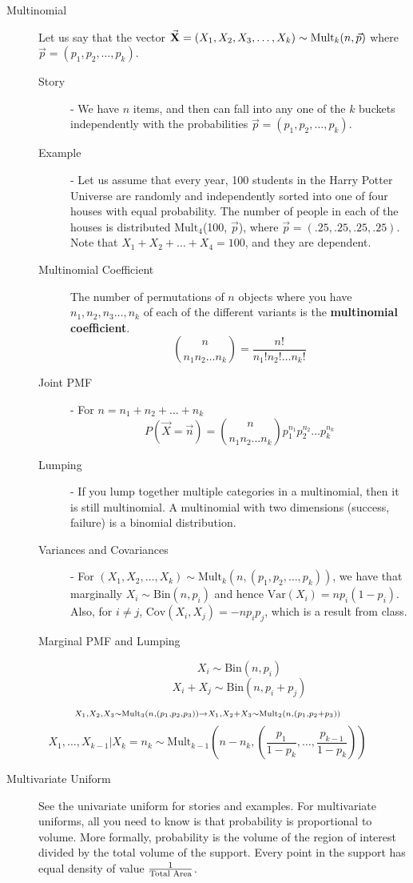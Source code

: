 \documentclass[10pt,landscape]{article}
\theoremstyle{definition}
\newcommand{\var}{\textrm{Var}}
\newcommand{\cov}{\textrm{Cov}}
\newcommand{\Bin}{\textrm{Bin}}
\newcommand{\Mult}{\textrm{Mult}}
\begin{document}
\begin{multicols}{3}
\begin{description}
\item[Multinomial]  
    Let us say that the vector $\vec{\textbf{X}} = (X_1, X_2, X_3, \dots, X_k) \sim \textnormal{Mult}_k(n, \vec{p})$  where $\vec{p} = (p_1, p_2, \dots, p_k)$.
\begin{description}
    \item[Story] - We have $n$ items, and then can fall into any one of the $k$ buckets independently with the probabilities $\vec{p} = (p_1, p_2, \dots, p_k)$.
    \item[Example] - Let us assume that every year, 100 students in the Harry Potter Universe are randomly and independently sorted into one of four houses with equal probability. The number of people in each of the houses is distributed $\Mult_4$(100, $\vec{p}$), where $\vec{p} = (.25, .25, .25, .25)$.
        Note that $X_1 + X_2 + \dots + X_4 = 100$, and they are dependent.
    \item[Multinomial Coefficient] The number of permutations of $n$ objects where you have $n_1, n_2, n_3 \dots, n_k$ of each of the different variants is the \textbf{multinomial coefficient}.
        \[{n \choose n_1n_2\dots n_k} = \frac{n!}{n_1!n_2!\dots n_k!}\]
    \item[Joint PMF] - For $n = n_1 + n_2 + \dots + n_k$
        \[P(\vec{X} = \vec{n}) = {n \choose n_1n_2\dots n_k}p_1^{n_1}p_2^{n_2}\dots p_k^{n_k}\]
    \item[Lumping] - If you lump together multiple categories in a multinomial, then it is still multinomial. A multinomial with two dimensions (success, failure) is a binomial distribution.
    \item[Variances and Covariances] - For $(X_1, X_2, \dots, X_k) \sim \Mult_k(n, (p_1, p_2, \dots, p_k))$, we have that marginally $X_i \sim \Bin(n, p_i)$ and hence $\var(X_i) = np_i(1-p_i)$. Also, for $i\neq j$, $\cov(X_i, X_j) = -np_ip_j$, which is a result from class.
    \item[Marginal PMF and Lumping]
        \[X_i \sim \Bin(n, p_i)\]
        \[X_i + X_j \sim \Bin(n, p_i + p_j)\]
\end{description}
\end{description}
        \[\mathsmaller{\mathsmaller{X_1, X_2, X_3 \sim \Mult_3(n, (p_1, p_2, p_3)) \rightarrow X_1, X_2 + X_3 \sim \Mult_2(n, (p_1, p_2 + p_3))}}\]
        \[X_1, \dots, X_{k-1} | X_k = n_k \sim \Mult_{k-1}\left(n - n_k, \left(\frac{p_1}{1 - p_k}, \dots, \frac{p_{k-1}}{1 - p_k}\right)\right)\]
\begin{description}
\item[Multivariate Uniform]
See the univariate uniform for stories and examples. For multivariate uniforms, all you need to know is that probability is proportional to volume. More formally, probability is the volume of the region of interest divided by the total volume of the support. Every point in the support has equal density of value $\frac{1}{\textnormal{Total Area}}$.


\end{description}
\end{multicols}
\end{document}
